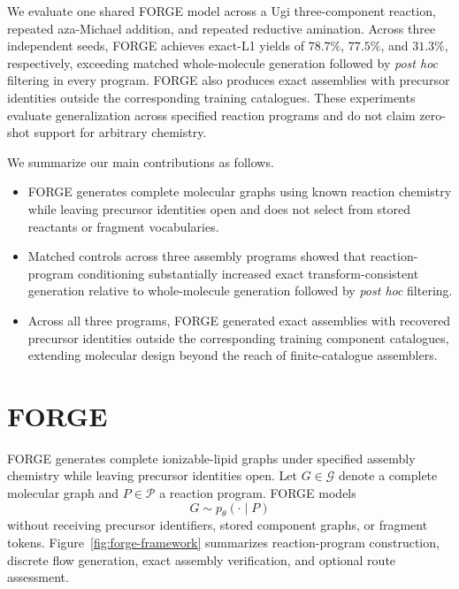 \documentclass{article}
\begin{document}
We evaluate one shared FORGE model across a Ugi three-component reaction, repeated aza-Michael addition, and repeated reductive amination. Across three independent seeds, FORGE achieves exact-L1 yields of $78.7\%$, $77.5\%$, and $31.3\%$, respectively, exceeding matched whole-molecule generation followed by \textit{post hoc} filtering in every program. FORGE also produces exact assemblies with precursor identities outside the corresponding training catalogues. These experiments evaluate generalization across specified reaction programs and do not claim zero-shot support for arbitrary chemistry.

We summarize our main contributions as follows.

\begin{itemize}
    \item FORGE generates complete molecular graphs using known reaction chemistry while leaving precursor identities open and does not select from stored reactants or fragment vocabularies.
    
    \item Matched controls across three assembly programs showed that reaction-program conditioning substantially increased exact transform-consistent generation relative to whole-molecule generation followed by \textit{post hoc} filtering.
    
    \item Across all three programs, FORGE generated exact assemblies with recovered precursor identities outside the corresponding training component catalogues, extending molecular design beyond the reach of finite-catalogue assemblers.
\end{itemize}

\section{FORGE}
\label{sec:forge}

FORGE generates complete ionizable-lipid graphs under specified assembly chemistry while leaving precursor identities open. Let $G\in\mathcal{G}$ denote a complete molecular graph and $P\in\mathcal{P}$ a reaction program. FORGE models
\begin{equation}
    G\sim p_\theta(\cdot\mid P)
\end{equation}
without receiving precursor identifiers, stored component graphs, or fragment tokens. Figure~\ref{fig:forge-framework} summarizes reaction-program construction, discrete flow generation, exact assembly verification, and optional route assessment.
\end{document}
